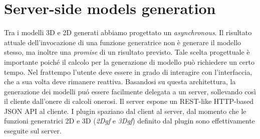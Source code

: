 \section{Server-side models generation}
\label{sec:chapter_3_section_5}

\noindent
Tra i modelli 3D e 2D generati abbiamo progettato un \emph{asynchronous}.
Il risultato attuale dell'invocazione di una funzione generatrice non \`e generare il modello stesso, ma inoltre una \emph{promise}
di un risultato previsto. Tale scelta progettuale \`e importante poich\'e il calcolo per la generazione di modello pu\`o richiedere
un certo tempo.
Nel frattempo l'utente deve essere in grado di interagire con l'interfaccia, che a sua volta deve rimanere reattiva.
Basandosi su questa architettura, la generazione dei modelli pu\'o essere facilmente delegata a un server,
sollevando così il cliente dall'onere di calcoli onerosi.  Il server espone un REST-like HTTP-based JSON API al cliente.
I plugin spaziano dal client al server, dal momento che le funzioni generatrici 2D e 3D (\emph{2Dgf} e \emph{3Dgf})
 definito dal plugin sono effettivamente eseguite sul server.

